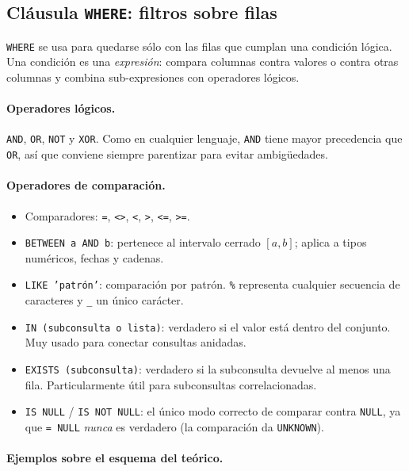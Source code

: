 \documentclass[11pt,a4paper]{article}
\begin{document}
\subsection{Cláusula \texttt{WHERE}: filtros sobre filas}

\texttt{WHERE} se usa para quedarse sólo con las filas que cumplan una
condición lógica. Una condición es una \emph{expresión}: compara columnas
contra valores o contra otras columnas y combina sub-expresiones con
operadores lógicos.

\paragraph{Operadores lógicos.}
\texttt{AND}, \texttt{OR}, \texttt{NOT} y \texttt{XOR}. Como en cualquier
lenguaje, \texttt{AND} tiene mayor precedencia que \texttt{OR}, así que
conviene siempre parentizar para evitar ambigüedades.

\paragraph{Operadores de comparación.}

\begin{itemize}
    \item Comparadores: \texttt{=}, \texttt{<>}, \texttt{<}, \texttt{>},
    \texttt{<=}, \texttt{>=}.
    \item \texttt{BETWEEN a AND b}: pertenece al intervalo cerrado $[a,b]$;
    aplica a tipos numéricos, fechas y cadenas.
    \item \texttt{LIKE 'patrón'}: comparación por patrón. \texttt{\%}
    representa cualquier secuencia de caracteres y \texttt{\_} un único
    carácter.
    \item \texttt{IN (subconsulta o lista)}: verdadero si el valor está dentro
    del conjunto. Muy usado para conectar consultas anidadas.
    \item \texttt{EXISTS (subconsulta)}: verdadero si la subconsulta devuelve
    al menos una fila. Particularmente útil para subconsultas correlacionadas.
    \item \texttt{IS NULL} / \texttt{IS NOT NULL}: el único modo correcto de
    comparar contra \texttt{NULL}, ya que \texttt{= NULL} \emph{nunca} es
    verdadero (la comparación da \texttt{UNKNOWN}).
\end{itemize}

\paragraph{Ejemplos sobre el esquema del teórico.}
\end{document}
